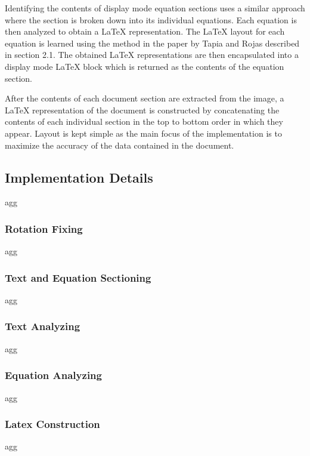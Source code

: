 \documentclass[12pt]{IEEEtran}
\newcommand{\latex}{\LaTeX\xspace}
\begin{document}
Identifying the contents of display mode equation sections uses a similar approach where the section is broken down  into its individual equations. Each equation is then analyzed to obtain a \latex representation. The \latex layout for each equation is learned using the method in the paper by Tapia and Rojas described in section 2.1. The obtained \latex representations are then encapsulated into a display mode \latex block which is returned as the contents of the equation section.

After the contents of each document section are extracted from the image, a \latex representation of the document is constructed by concatenating the contents of each individual section in the top to bottom order in which they appear. Layout is kept simple as the main focus of the implementation is to maximize the accuracy of the data contained in the document.

\subsection{Implementation Details}

agg

\subsubsection{Rotation Fixing}

agg

\subsubsection{Text and Equation Sectioning}

agg

\subsubsection{Text Analyzing}

agg

\subsubsection{Equation Analyzing}

agg

\subsubsection{Latex Construction}

agg
\end{document}
